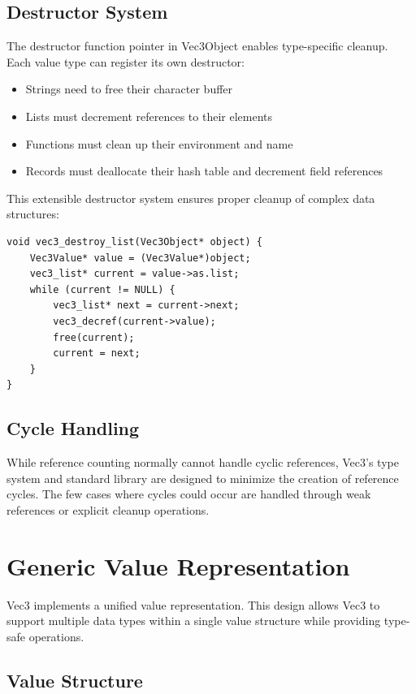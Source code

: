 \subsection{Destructor System}\label{subsec:destructor-system}
The destructor function pointer in Vec3Object enables type-specific cleanup.
Each value type can register its own destructor:

\begin{itemize}[nolistsep]
\item Strings need to free their character buffer
\item Lists must decrement references to their elements
\item Functions must clean up their environment and name
\item Records must deallocate their hash table and decrement field references
\end{itemize}

This extensible destructor system ensures proper cleanup of complex data structures:

\begin{verbatim}
void vec3_destroy_list(Vec3Object* object) {
    Vec3Value* value = (Vec3Value*)object;
    vec3_list* current = value->as.list;
    while (current != NULL) {
        vec3_list* next = current->next;
        vec3_decref(current->value);
        free(current);
        current = next;
    }
}
\end{verbatim}

\subsection{Cycle Handling}\label{subsec:cycle-handling}
While reference counting normally cannot handle cyclic references, Vec3's type system and standard library are designed to minimize the creation of reference cycles.
The few cases where cycles could occur are handled through weak references or explicit cleanup operations.

\section{Generic Value Representation}\label{sec:generic-value}

Vec3 implements a unified value representation.
This design allows Vec3 to support multiple data types within a single value structure while providing type-safe operations.

\subsection{Value Structure}\label{subsec:value-structure}

